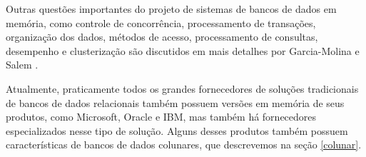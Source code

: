 Outras questões importantes do projeto de sistemas de bancos de dados em memória, como controle de concorrência, processamento de transações, organização dos dados, métodos de acesso, processamento de consultas, desempenho e clusterização são discutidos em mais detalhes por Garcia-Molina e Salem \cite{garcia1992main}.

Atualmente, praticamente todos os grandes fornecedores de soluções tradicionais de bancos de dados relacionais também possuem versões em memória de seus produtos, como Microsoft, Oracle e IBM, mas também há fornecedores especializados nesse tipo de solução. Alguns desses produtos também possuem características de bancos de dados colunares, que descrevemos na seção \ref{colunar}.






